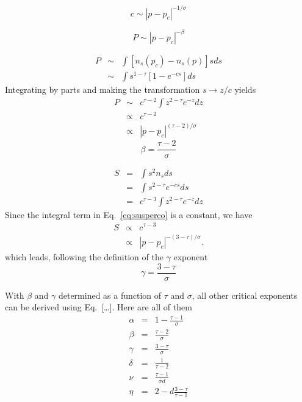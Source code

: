 \begin{equation}
    c\sim\left|p-p_c\right|^{-1/\sigma}
\end{equation}

\begin{equation}
    P\sim\left|p-p_c\right|^{-\beta}
\end{equation}

 
\begin{eqnarray*}
P & \sim & \int\left[n_{s}\left(p_{c}\right)-n_{s}\left(p\right)\right]sds\\
 & \sim & \int s^{1-\tau}\left[1-e^{-cs}\right]ds
\end{eqnarray*}
Integrating by parts and making the transformation $s\rightarrow z/c$ yields
\begin{eqnarray*}
P & \sim & c^{\tau-2}\int z^{2-\tau}e^{-z}dz\\
 & \propto & c^{\tau-2}\\
 & \propto & \left|p-p_{c}\right|^{\left(\tau-2\right)/\sigma}
\end{eqnarray*}
\begin{equation}
    \beta=\frac{\tau-2}{\sigma}
\end{equation}
    

\begin{eqnarray}
S & = & \int s^{2}n_{s}ds\\
 & = & \int s^{2-\tau}e^{-cs}ds\\
 & = & c^{\tau-3}\int z^{2-\tau}e^{-z}dz
 \label{eq:susperco}
\end{eqnarray}
Since the integral term in Eq.~\ref{eq:susperco} is a constant, we have
\begin{eqnarray}
 S & \propto & c^{\tau-3}\\
 & \propto & \left|p-p_{c}\right|^{-\left(3-\tau\right)/\sigma}.
\end{eqnarray}
which leads, following the definition of the $\gamma$ exponent
\begin{equation}
    \gamma=\frac{3-\tau}{\sigma}
\end{equation}

With $\beta$ and $\gamma$ determined as a function of $\tau$ and $\sigma$, all
other critical exponents can be derived using Eq.~[\ldots].
Here are all of them
\begin{eqnarray}
    \alpha & = & 1-\frac{\tau-1}{\sigma}\\
    \beta  & = & \frac{\tau-2}{\sigma}\\
    \gamma & = & \frac{3-\tau}{\sigma}\\
    \delta & = & \frac{1}{\tau-2}\\
    \nu    & = & \frac{\tau-1}{\sigma d}\\
    \eta   & = & 2-d\frac{3-\tau}{\tau-1}
\end{eqnarray}

